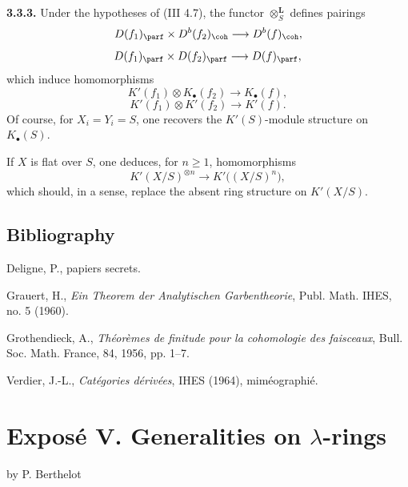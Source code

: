 \textbf{3.3.3.} Under the hypotheses of (III 4.7), the functor \(\otimes_S^{\mathbf L}\) defines pairings
\[
 D(f_1)_{\parf}\times D^b(f_2)_{\coh}\longrightarrow D^b(f)_{\coh},
\]
\[
 D(f_1)_{\parf}\times D(f_2)_{\parf}\longrightarrow D(f)_{\parf},
\]
which induce homomorphisms
\[
 K'(f_1)\otimes K_{\bullet}(f_2)\longrightarrow K_{\bullet}(f),
\]
\[
 K'(f_1)\otimes K'(f_2)\longrightarrow K'(f).
\]
Of course, for \(X_i=Y_i=S\), one recovers the \(K'(S)\)-module structure on \(K_{\bullet}(S)\).

If \(X\) is flat over \(S\), one deduces, for \(n\geq1\), homomorphisms
\[
 K'(X/S)^{\otimes n}\longrightarrow K'\bigl((X/S)^n\bigr),
\]
which should, in a sense, replace the absent ring structure on \(K'(X/S)\).

\subsection*{Bibliography}
\begin{enumerate}[label={[\arabic*]}]
\item Deligne, P., papiers secrets.
\item Grauert, H., \emph{Ein Theorem der Analytischen Garbentheorie}, Publ. Math. IHES, no. 5 (1960).
\item Grothendieck, A., \emph{Théorèmes de finitude pour la cohomologie des faisceaux}, Bull. Soc. Math. France, 84, 1956, pp. 1--7.
\item[{[V]}] Verdier, J.-L., \emph{Catégories dérivées}, IHES (1964), miméographié.
\end{enumerate}



\providecommand{\Chat}{\widehat C}
\providecommand{\Ghat}{\widehat G}
\providecommand{\Gg}{\widehat G_g}
\providecommand{\Ga}{\widehat G_a}
\providecommand{\Grhat}{\widehat{\operatorname{Gr}}}
\providecommand{\Abfil}{\mathrm{Ab\,fil}}
\providecommand{\Kalgfil}{K\text{-}\mathrm{Alg.fil.}}
\providecommand{\Hom}{\operatorname{Hom}}
\providecommand{\Sym}{\mathfrak S}
\providecommand{\id}{\operatorname{Id}}
\providecommand{\Log}{\operatorname{Log}}
\providecommand{\Toddc}{\operatorname{Todd}}
\providecommand{\Ob}{\operatorname{Ob}}
\providecommand{\cG}{\mathcal G}
\providecommand{\cCzero}{\mathcal C_0}
\providecommand{\Fil}{\operatorname{Fil}}


\section*{Exposé V. Generalities on \(\lambda\)-rings}
\begin{center}
by P. Berthelot
\end{center}

